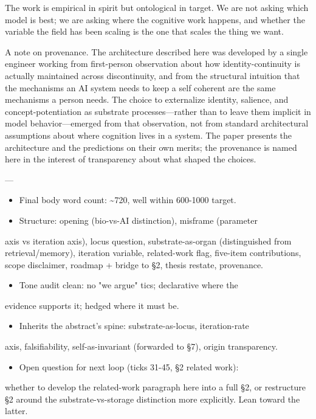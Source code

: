 \documentclass[11pt,letterpaper]{article}
\begin{document}
The work is empirical in spirit but ontological in target. We are
not asking which model is best; we are asking where the cognitive
work happens, and whether the variable the field has been scaling
is the one that scales the thing we want.

A note on provenance. The architecture described here was
developed by a single engineer working from first-person
observation about how identity-continuity is actually maintained
across discontinuity, and from the structural intuition that the
mechanisms an AI system needs to keep a self coherent are the same
mechanisms a person needs. The choice to externalize identity,
salience, and concept-potentiation as substrate processes---rather
than to leave them implicit in model behavior---emerged from that
observation, not from standard architectural assumptions about
where cognition lives in a system. The paper presents the
architecture and the predictions on their own merits; the
provenance is named here in the interest of transparency about
what shaped the choices.

---

\begin{itemize}
  \item Final body word count: \textasciitilde{}720, well within 600-1000 target.
  \item Structure: opening (bio-vs-AI distinction), misframe (parameter
\end{itemize}
  axis vs iteration axis), locus question, substrate-as-organ
  (distinguished from retrieval/memory), iteration variable,
  related-work flag, five-item contributions, scope disclaimer,
  roadmap + bridge to §2, thesis restate, provenance.
\begin{itemize}
  \item Tone audit clean: no "we argue" tics; declarative where the
\end{itemize}
  evidence supports it; hedged where it must be.
\begin{itemize}
  \item Inherits the abstract's spine: substrate-as-locus, iteration-rate
\end{itemize}
  axis, falsifiability, self-as-invariant (forwarded to §7),
  origin transparency.
\begin{itemize}
  \item Open question for next loop (ticks 31-45, §2 related work):
\end{itemize}
  whether to develop the related-work paragraph here into a full
  §2, or restructure §2 around the substrate-vs-storage distinction
  more explicitly. Lean toward the latter.
\end{document}
